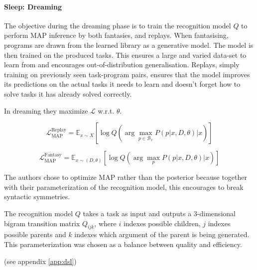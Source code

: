 \paragraph{Sleep: Dreaming} The objective during the dreaming phase is to train the recognition model $Q$ to perform MAP inference by both fantasies, and replays. When fantasising, programs are drawn from the learned library as a generative model. The model is then trained on the produced tasks. This ensures a large and varied data-set to learn from and encourages out-of-distribution generalisation. Replays, simply training on previously seen task-program pairs, ensures that the model improves its predictions on the actual tasks it needs to learn and doesn't forget how to solve tasks it has already solved correctly.

In dreaming they maximize \(\mathcal{L}\) w.r.t. \(\theta\).

\[
    \mathcal{L}_{\text{MAP}}^{\text{Replay}} = \mathbb{E}_{x\sim X} \left[ \log Q \left( \arg\max_{p \in \mathcal{B}_x} P(p|x, D, \theta)  \Big\lvert x \right) \right]
\]

\[
    \mathcal{L}_{\text{MAP}}^{\text{Fantasy}} = \mathbb{E}_{x \sim (D, \theta)} \left[ \log Q \left( \arg\max_{p} P(p|x, D, \theta) \Big\lvert x \right) \right]  
\]

The authors chose to optimize MAP rather than the posterior because together with their parameterization of the recognition model, this encourages to break syntactic symmetries.

The recognition model \(Q\) takes a task as input and outputs a 3-dimensional bigram transition matrix \(Q_{ijk}\), where \(i\) indexes possible children, \(j\) indexes possible parents and \(k\) indexes which argument of the parent is being generated. This parameterization was chosen as a balance between quality and efficiency.




(see appendix \ref{app:dsl})

